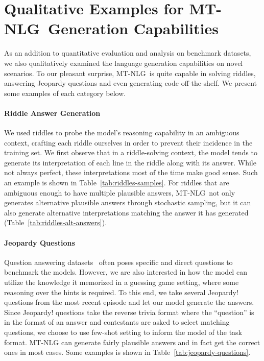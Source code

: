 \documentclass[11pt]{article}
\newcommand{\ours}{MT-NLG}
\begin{document}
\section{Qualitative Examples for \ours~Generation Capabilities}
\label{sec:gen_capa}
As an addition to quantitative evaluation and analysis on benchmark datasets, we also qualitatively examined the language generation capabilities on novel scenarios. To our pleasant surprise, \ours~is quite capable in solving riddles, answering Jeopardy questions and even generating code off-the-shelf. We present some examples of each category below.

\paragraph{Riddle Answer Generation}

We used riddles to probe the model's reasoning capability in an ambiguous context, crafting each riddle ourselves in order to prevent their incidence in the training set. We first observe that in a riddle-solving context, the model tends to generate its interpretation of each line in the riddle along with its answer. While not always perfect, these interpretations most of the time make good sense. Such an example is shown in Table~\ref{tab:riddles-samples}. For riddles that are ambiguous enough to have multiple plausible answers, \ours~not only generates alternative plausible answers through stochastic sampling, but it can also generate alternative interpretations matching the answer it has generated (Table~\ref{tab:riddles-alt-answers}).

\paragraph{Jeopardy Questions}

Question answering datasets~\citep{kwiatkowski2019naturalquestions,Joshi2017TriviaQAAL} often poses specific and direct questions to benchmark the models. However, we are also interested in how the model can utilize the knowledge it memorized in a guessing game setting, where some reasoning over the hints is required. To this end, we take several Jeopardy! questions from the most recent episode and let our model generate the answers. Since Jeopardy! questions take the reverse trivia format where the ``question'' is in the format of an answer and contestants are asked to select matching questions, we choose to use few-shot setting to inform the model of the task format. {\ours} can generate fairly plausible answers and in fact get the correct ones in most cases. Some examples is shown in Table~\ref{tab:jeopardy-questions}.
\end{document}
